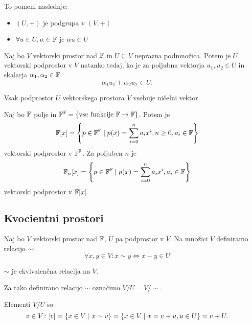 \documentclass[12pt, a4paper]{article}
\begin{document}
\begin{opomba}
To pomeni naslednje:

\begin{itemize}
\item $(U,+)$ je podgrupa v $(V,+)$
\item $\forall u\in U,\alpha\in\mathbb{F}$ je $\alpha u\in U$
\end{itemize}
\end{opomba}

\begin{trditev}
Naj bo $V$ vektorski prostor nad $\mathbb{F}$ in $U\subseteq V$ neprazna podmnožica. Potem je $U$ vektorski podprostor v  $V$ natanko tedaj, ko je za poljubna vektorja $u_1,u_2\in U$ in skalarja $\alpha_1,\alpha_2\in\mathbb{F}$
\[
\alpha_1u_1+\alpha_2u_2\in U.
\]
\end{trditev}

\obvs

\begin{opomba}
Vsak podprostor $U$ vektorskega prostora $V$ vsebuje ničelni vektor.
\end{opomba}

\begin{trditev}
Naj bo $\mathbb{F}$ polje in $\mathbb{F}^{\mathbb{F}}=\left\{\text{vse funkcije $\mathbb{F}\to\mathbb{F}$}\right\}$. Potem je
\[
\mathbb{F}[x]=\left\{p\in\mathbb{F}^{\mathbb{F}}\mid p(x)=\sum_{i=0}^na_ix^i,n\geq 0,a_i\in\mathbb{F}\right\}
\]
vektorski podprostor v $\mathbb{F}^{\mathbb{F}}$. Za poljuben $n$ je
\[
\mathbb{F}_n[x]=\left\{p\in\mathbb{F}^{\mathbb{F}}\mid p(x)=\sum_{i=0}^na_ix^i,a_i\in\mathbb{F}\right\}
\]
vektorski podprostor v $\mathbb{F}[x]$.
\end{trditev}

\obvs

\newpage

\subsection{Kvocientni prostori}

\begin{definicija}
Naj bo $V$ vektorski prostor nad $\mathbb{F}$, $U$ pa podprostor v $V$. Na množici $V$ definiramo relacijo $\sim$:
\[
\forall x,y\in V\colon x\sim y\iff x-y\in U
\]
\end{definicija}

\begin{trditev}
$\sim$ je ekvivalenčna relacija na $V$.
\end{trditev}

\obvs

Za tako definirano relacijo $\sim$ označimo $V/U=V/{\sim}$.

Elementi $V/U$ so
\[
v\in V\colon [v]=\left\{x\in V\mid x\sim v\right\}=\left\{x\in V\mid x=v+u,u\in U\right\}=v+U.
\]
\end{document}
